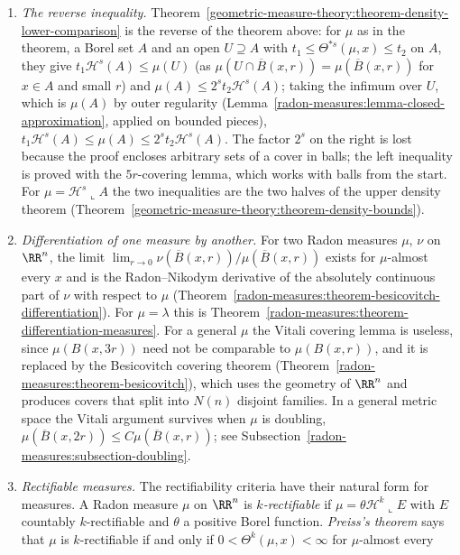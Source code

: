 \begin{remark}\label{geometric-measure-theory:remark-measure-densities}
\begin{enumerate}
\item \emph{The reverse inequality.} Theorem~\ref{geometric-measure-theory:theorem-density-lower-comparison} is the reverse of the theorem above: for $\mu$ as in the theorem, a Borel set $A$ and an open
$U \supseteq A$ with $t_1 \leq \Theta^{*s}(\mu, x) \leq t_2$ on $A$, they give $t_1\mathcal{H}^s(A) \leq \mu(U)$ (as $\mu(U \cap \overline{B}(x, r)) = \mu(\overline{B}(x, r))$ for $x \in A$ and small $r$)
and $\mu(A) \leq 2^st_2\mathcal{H}^s(A)$; taking the infimum over $U$, which is $\mu(A)$ by outer regularity (Lemma~\ref{radon-measures:lemma-closed-approximation}, applied on bounded pieces),
$t_1\mathcal{H}^s(A) \leq \mu(A) \leq 2^st_2\mathcal{H}^s(A)$. The factor $2^s$ on the right is lost because the proof encloses arbitrary sets of a cover in balls; the left inequality is proved with
the $5r$-covering lemma, which works with balls from the start. For $\mu = \mathcal{H}^s\llcorner A$ the two inequalities are the two halves of the upper density theorem
(Theorem~\ref{geometric-measure-theory:theorem-density-bounds}).
\item \emph{Differentiation of one measure by another.} For two Radon measures $\mu$, $\nu$ on $\RR^n$, the limit $\lim_{r \to 0}\nu(\overline{B}(x, r))/\mu(\overline{B}(x, r))$ exists for $\mu$-almost every $x$
and is the Radon--Nikodym derivative of the absolutely continuous part of $\nu$ with respect to $\mu$ (Theorem~\ref{radon-measures:theorem-besicovitch-differentiation}). For $\mu = \lambda$ this is
Theorem~\ref{radon-measures:theorem-differentiation-measures}. For a general $\mu$ the Vitali covering lemma is useless, since $\mu(B(x, 3r))$ need not be comparable to $\mu(B(x, r))$, and it is
replaced by the Besicovitch covering theorem (Theorem~\ref{radon-measures:theorem-besicovitch}), which uses the geometry of $\RR^n$ and produces covers that split into $N(n)$ disjoint
families. In a general metric space the Vitali argument survives
when $\mu$ is doubling, $\mu(\overline{B}(x, 2r)) \leq C\mu(\overline{B}(x, r))$; see Subsection~\ref{radon-measures:subsection-doubling}.
\item \emph{Rectifiable measures.} The rectifiability criteria have their natural form for measures. A Radon measure $\mu$ on $\RR^n$ is \emph{$k$-rectifiable} if $\mu = \theta\mathcal{H}^k\llcorner E$
with $E$ countably $k$-rectifiable and $\theta$ a positive Borel function. \emph{Preiss's theorem} says that $\mu$ is $k$-rectifiable if and only if $0 < \Theta^k(\mu, x) < \infty$ for $\mu$-almost every

\end{enumerate}
\end{remark}
